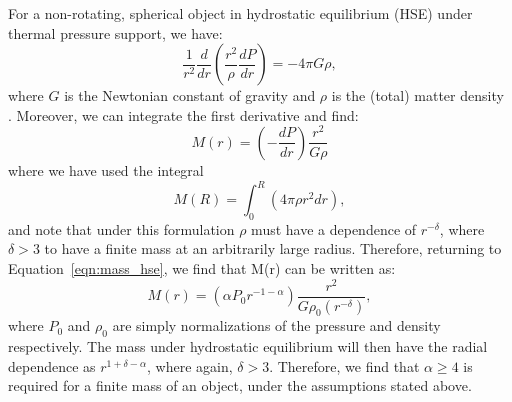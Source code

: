 \documentclass[twocolumn,traditabstract]{aa}
\begin{document}
For a non-rotating, spherical object in hydrostatic equilibrium (HSE) under thermal pressure support, we have:
\begin{equation}
  \frac{1}{r^2}\frac{d}{dr}\left( \frac{r^2}{\rho}\frac{dP}{dr} \right) = -4\pi G \rho,
  \label{eqn:landau_hse}
\end{equation}
where $G$ is the Newtonian constant of gravity and $\rho$ is the (total) matter density \citep{landau1959}.
Moreover, we can integrate the first derivative and find:
\begin{equation}
  M(r) = \left( - \frac{dP}{dr} \right) \frac{r^2}{G \rho}
  \label{eqn:mass_hse}
\end{equation}
where we have used the integral
\begin{equation}
  M(R) = \int_{0} ^R (4 \pi \rho r^2 dr),
  \label{eqn:mass_def}
\end{equation}
and note that under this formulation $\rho$ must have a dependence of $r^{-\delta}$, where $\delta > 3$ to have a finite mass
at an arbitrarily large radius. Therefore, returning to Equation~\ref{eqn:mass_hse}, we find that M(r) can be written as:
\begin{equation}
  M(r) =   \left(\alpha P_0 r^{-1-\alpha} \right) \frac{r^2}{G \rho_0 (r^{-\delta})},
\end{equation}
where $P_0$ and $\rho_0$ are simply normalizations of the pressure and density respectively. The mass under hydrostatic
equilibrium will then have the radial dependence as $r^{1+\delta - \alpha}$, where again, $\delta > 3$. Therefore, we find
that $\alpha \ge 4$ is required for a finite mass of an object, under the assumptions stated above.




%

\label{references}
\end{document}
